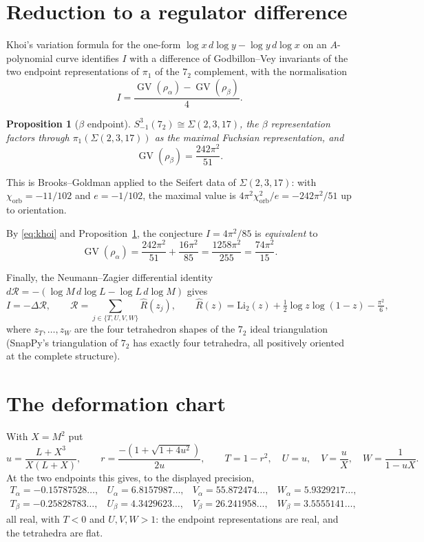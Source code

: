 \documentclass[11pt]{article}
\newtheorem{proposition}[theorem]{Proposition}
\theoremstyle{remark}
\DeclareMathOperator{\GV}{GV}
\newcommand{\Rhat}{\widehat{R}}
\begin{document}
\section{Reduction to a regulator difference}

Khoi's variation formula for the one-form $\log x\,d\log y-\log y\,d\log x$ on
an $A$-polynomial curve identifies $I$ with a difference of Godbillon--Vey
invariants of the two endpoint representations of $\pi_1$ of the $7_2$
complement, with the normalisation
\begin{equation}\label{eq:khoi}
I=\frac{\GV(\rho_\alpha)-\GV(\rho_\beta)}{4}.
\end{equation}

\begin{proposition}[$\beta$ endpoint]\label{prop:beta}
$S^3_{-1}(7_2)\cong\Sigma(2,3,17)$, the $\beta$ representation factors through
$\pi_1(\Sigma(2,3,17))$ as the maximal Fuchsian representation, and
\[
\GV(\rho_\beta)=\frac{242\pi^2}{51}.
\]
\end{proposition}
This is Brooks--Goldman applied to the Seifert data of $\Sigma(2,3,17)$: with
$\chi_{\mathrm{orb}}=-11/102$ and $e=-1/102$, the maximal value is
$4\pi^2\chi_{\mathrm{orb}}^2/e=-242\pi^2/51$ up to orientation.

By \eqref{eq:khoi} and Proposition~\ref{prop:beta}, the conjecture
$I=4\pi^2/85$ is \emph{equivalent} to
\begin{equation}\label{eq:target}
\GV(\rho_\alpha)=\frac{242\pi^2}{51}+\frac{16\pi^2}{85}
=\frac{1258\pi^2}{255}=\frac{74\pi^2}{15}.
\end{equation}

Finally, the Neumann--Zagier differential identity
$d\mathcal R=-(\log M\,d\log L-\log L\,d\log M)$ gives
\begin{equation}\label{eq:NZ}
I=-\Delta\mathcal R,\qquad
\mathcal R=\sum_{j\in\{T,U,V,W\}}\Rhat(z_j),\qquad
\Rhat(z)=\mathrm{Li}_2(z)+\tfrac12\log z\log(1-z)-\tfrac{\pi^2}{6},
\end{equation}
where $z_T,\dots,z_W$ are the four tetrahedron shapes of the $7_2$ ideal
triangulation (SnapPy's triangulation of $7_2$ has exactly four tetrahedra, all
positively oriented at the complete structure).

\section{The deformation chart}

With $X=M^2$ put
\begin{equation}\label{eq:chart}
u=\frac{L+X^3}{X(L+X)},\qquad
r=\frac{-(1+\sqrt{1+4u^2})}{2u},\qquad
T=1-r^2,\quad U=u,\quad V=\frac uX,\quad W=\frac1{1-uX}.
\end{equation}
At the two endpoints this gives, to the displayed precision,
\[
\begin{array}{llll}
T_\alpha=-0.15787528\ldots,&U_\alpha=6.8157987\ldots,&
V_\alpha=55.872474\ldots,&W_\alpha=5.9329217\ldots,\\[2pt]
T_\beta=-0.25828783\ldots,&U_\beta=4.3429623\ldots,&
V_\beta=26.241958\ldots,&W_\beta=3.5555141\ldots,
\end{array}
\]
all real, with $T<0$ and $U,V,W>1$: the endpoint representations are real, and
the tetrahedra are flat.
\end{document}
